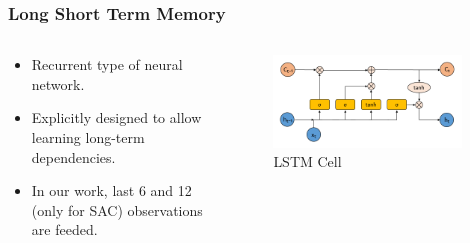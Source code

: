 \documentclass{beamer}
\begin{document}
\begin{frame}
\frametitle{Long Short Term Memory}
\begin{columns}[onlytextwidth]
	\begin{column}{.49\textwidth}
		\begin{itemize}
			\item Recurrent type of neural network.
			\item Explicitly designed to allow learning long-term dependencies.
			\item In our work, last 6 and 12 (only for SAC) observations are feeded. 
		\end{itemize}
	\end{column}
	\begin{column}{.49\textwidth}
		\begin{figure}
			\centering
			\includegraphics[width=0.95\textwidth]{figures/ml_theory/lstm_cell.png}
			\caption{LSTM Cell}
			\label{fig:lstm_cell}
		\end{figure}
	\end{column}
\end{columns}
\end{frame}

\end{document}
